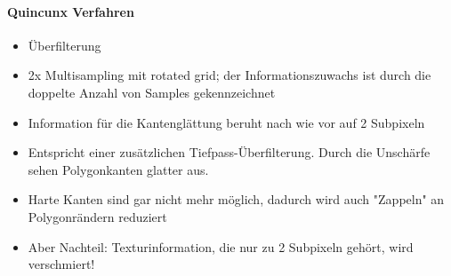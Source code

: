 \documentclass[10pt,landscape]{article}
\begin{document}
\begin{multicols}{3}
  \paragraph{Quincunx Verfahren}
  \begin{itemize}
    \item Überfilterung
    \item 2x Multisampling mit rotated grid; der Informationszuwachs ist durch die doppelte Anzahl von Samples gekennzeichnet
    \item Information für die Kantenglättung beruht nach wie vor auf 2 Subpixeln
    \item Entspricht einer zusätzlichen Tiefpass-Überfilterung. Durch die Unschärfe sehen Polygonkanten glatter aus.
    \item Harte Kanten sind gar nicht mehr möglich, dadurch wird auch "Zappeln" an Polygonrändern reduziert
    \item Aber Nachteil: Texturinformation, die nur zu 2 Subpixeln gehört, wird verschmiert!
  \end{itemize}
  

\end{multicols}
\end{document}
